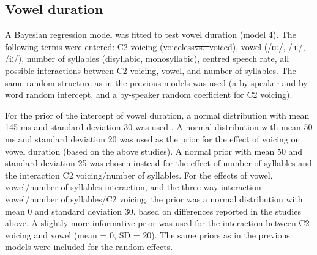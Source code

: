 \documentclass[12pt,a4paper,]{article}
\providecommand{\DIFaddtex}[1]{{\protect\color{blue}\uwave{#1}}} %
\providecommand{\DIFdeltex}[1]{{\protect\color{red}\sout{#1}}}                      %
\providecommand{\DIFaddbegin}{} %
\providecommand{\DIFaddend}{} %
\providecommand{\DIFdelbegin}{} %
\providecommand{\DIFdelend}{} %
\providecommand{\DIFadd}[1]{\texorpdfstring{\DIFaddtex{#1}}{#1}} %
\providecommand{\DIFdel}[1]{\texorpdfstring{\DIFdeltex{#1}}{}} %
\newcommand{\DIFscaledelfig}{0.5}
\newlength{\DIFdelgraphicswidth} %
\newlength{\DIFdelgraphicsheight} %
\newcommand{\DIFaddincludegraphics}[2][]{{\color{blue}\fbox{\DIFOincludegraphics[#1]{#2}}}} %
\newcommand{\DIFdelincludegraphics}[2][]{%
\sbox{\DIFdelgraphicsbox}{\DIFOincludegraphics[#1]{#2}}%
\settoboxwidth{\DIFdelgraphicswidth}{\DIFdelgraphicsbox} %
\settoboxtotalheight{\DIFdelgraphicsheight}{\DIFdelgraphicsbox} %
\scalebox{\DIFscaledelfig}{%
\parbox[b]{\DIFdelgraphicswidth}{\usebox{\DIFdelgraphicsbox}\\[-\baselineskip] \rule{\DIFdelgraphicswidth}{0em}}\llap{\resizebox{\DIFdelgraphicswidth}{\DIFdelgraphicsheight}{%
\setlength{\unitlength}{\DIFdelgraphicswidth}%
\begin{picture}(1,1)%
\thicklines\linethickness{2pt} %
{\color[rgb]{1,0,0}\put(0,0){\framebox(1,1){}}}%
{\color[rgb]{1,0,0}\put(0,0){\line( 1,1){1}}}%
{\color[rgb]{1,0,0}\put(0,1){\line(1,-1){1}}}%
\end{picture}%
}\hspace*{3pt}}} %
} %
\DeclareRobustCommand{\DIFaddbegin}{\DIFOaddbegin \let\includegraphics\DIFaddincludegraphics} %
\DeclareRobustCommand{\DIFaddend}{\DIFOaddend \let\includegraphics\DIFOincludegraphics} %
\DeclareRobustCommand{\DIFdelbegin}{\DIFOdelbegin \let\includegraphics\DIFdelincludegraphics} %
\DeclareRobustCommand{\DIFdelend}{\DIFOaddend \let\includegraphics\DIFOincludegraphics} %
\begin{document}
\hypertarget{vowel-duration}{%
\subsection{Vowel duration}\label{vowel-duration}}

\label{s:vow}

A Bayesian regression model was fitted to test vowel duration (model 4).
The following terms were entered: C2 voicing (voiceless\DIFdelbegin \DIFdel{vs.~}\DIFdelend \DIFaddbegin \DIFadd{, }\DIFaddend voiced), vowel
(/ɑː/, /ɜː/, /iː/), number of syllables (disyllabic, monosyllabic),
centred speech rate, all possible interactions between C2 voicing,
vowel, and number of syllables. The same random structure as in the
previous models was used (a by-speaker and by-word random intercept, and
a by-speaker random coefficient for C2 voicing).

For the prior of the intercept of vowel duration, a normal distribution
with mean 145 ms and standard deviation 30 was used
\citep{heffner1937, house1953, peterson1960, sharf1962, chen1970, klatt1973, davis1989, laeufer1992, ko2018}.
A normal distribution with mean 50 ms and standard deviation 20 was used
as the prior for the effect of voicing on vowel duration (based on the
above studies). A normal prior with mean 50 and standard deviation 25
was chosen instead for the effect of number of syllables and the
interaction C2 voicing/number of syllables. For the effects of vowel,
vowel/number of syllables interaction, and the three-way interaction
vowel/number of syllables/C2 voicing, the prior was a normal
distribution with mean 0 and standard deviation 30, based on differences
reported in the studies above. A slightly more informative prior was
used for the interaction between C2 voicing and vowel (mean = 0, SD =
20). The same priors as in the previous models were included for the
random effects.
\end{document}
